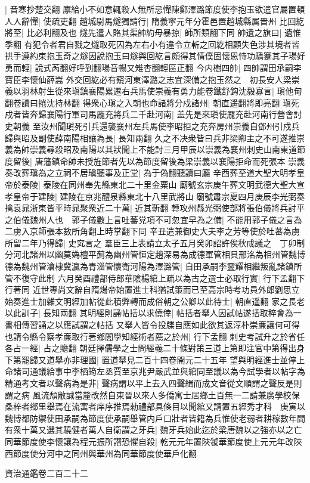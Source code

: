 |{
	音寒抄楚交翻}
廪給小不如意輒殺人無所忌憚陳鄭澤潞節度使李抱玉欲遣官屬置頓人人辭憚|{
	使疏吏翻}
趙城尉馬燧獨請行|{
	隋義寜元年分霍邑置趙城縣属晋州}
比回紇將至|{
	比必利翻及也}
燧先遣人賂其渠帥約毋暴掠|{
	師所類翻下同}
帥遺之旗曰|{
	遺惟季翻}
有犯令者君自戮之燧取死囚為左右小有違令立斬之回紇相顧失色涉其境者皆拱手遵約束抱玉奇之燧因說抱玉曰燧與回紇言頗得其情僕固懷恩恃功驕蹇其子瑒好勇而輕|{
	說式芮翻好呼到翻瑒音暢又雉杏翻輕區正翻}
今内樹四帥|{
	四帥謂田承嗣李寶臣李懷仙薛嵩}
外交回紇必有窺河東澤潞之志宜深備之抱玉然之　初長安人梁崇義以羽林射生從來瑱鎮襄陽累遷右兵馬使崇義有勇力能卷鐵舒鈎沈毅寡言|{
	瑱他甸翻卷讀曰捲沈持林翻}
得衆心瑱之入朝也命諸將分戍諸州|{
	朝直遥翻將即亮翻}
瑱死戍者皆奔歸襄陽行軍司馬龐充將兵二千赴河南|{
	盖先是來瑱使龎充赴河南行營會討史朝義}
至汝州聞瑱死引兵還襲襄州左兵馬使李昭拒之充奔房州崇義自鄧州引戍兵歸與昭及副使薛南陽相讓為長|{
	長知兩翻}
久之不决衆皆曰兵非梁卿主之不可遂推崇義為帥崇義尋殺昭及南陽以其狀聞上不能討三月甲辰以崇義為襄州刺史山南東道節度留後|{
	唐藩鎮命帥未授旌節者先以為節度留後為梁崇義以襄陽拒命而死張本}
崇義奏改葬瑱為之立祠不居瑱聽事及正堂|{
	為于偽翻聽讀曰廳}
辛酉葬至道大聖大明孝皇帝於泰陵|{
	泰陵在同州奉先縣東北二十里金粟山}
廟號玄宗庚午葬文明武德大聖大宣孝皇帝于建陵|{
	建陵在京兆醴泉縣東北十八里武將山}
廟號肅宗夏四月庚辰李光弼奏擒袁晁浙東皆平時晁聚衆近二十萬|{
	近其靳翻}
轉攻州縣光弼使部將張伯儀將兵討平之伯儀魏州人也　郭子儀數上言吐蕃党項不可忽宜早為之備|{
	不能用郭子儀之言為二虜入京師張本數所角翻上時掌翻下同}
辛丑遣兼御史大夫李之芳等使於吐蕃為虜所留二年乃得歸|{
	史䆒言之}
羣臣三上表請立太子五月癸卯詔許俟秋成議之　丁卯制分河北諸州以幽莫媯檀平薊為幽州管恒定趙深易為成德軍管相貝邢洺為相州管魏博德為魏州管滄棣冀瀛為青淄管懷衛河陽為澤潞管|{
	自田承嗣李靈耀相繼叛亂諸鎮所管不復守此制}
六月癸酉禮部侍郎華隂楊綰上疏以為古之選士必取行實|{
	行下孟翻下行著同}
近世專尚文辭自隋煬帝始置進士科猶試策而已至高宗時考功員外郎劉思立始奏進士加雜文明經加帖從此積弊轉而成俗朝之公卿以此待士|{
	朝直遥翻}
家之長老以此訓子|{
	長知兩翻}
其明經則誦帖括以求僥倖|{
	帖括者舉人因試帖遂括取稡會為一書相傳習誦之以應試謂之帖括}
又舉人皆令投牒自應如此欲其返淳朴崇亷讓何可得也請令縣令察孝亷取行著鄉閭學知經術者薦之於州|{
	行下孟翻}
刺史考試升之於省任各占一經|{
	占之贍翻}
朝廷擇儒學之士問經義二十條對策三道上第即注官中第得出身下第罷歸又道舉亦非理國|{
	置道舉見二百十四卷開元二十五年}
望與明經進士並停上命諸司通議給事中李栖筠左丞賈至京兆尹嚴武並與綰同至議以為今試學者以帖字為精通考文者以聲病為是非|{
	聲病謂以平上去入四聲緝而成文音從文順謂之聲反是則謂之病}
風流頹敝誠當釐改然自東晉以來人多僑寓士居鄉土百無一二請兼廣學校保桑梓者鄉里舉焉在流寓者庠序推焉勑禮部具條目以聞綰又請置五經秀才科　庚寅以魏博都防禦使田承嗣為節度使承嗣舉管内戶口壯者皆籍為兵惟使老弱者耕稼數年間有衆十萬又選其驍健者萬人自衛謂之牙兵|{
	魏牙兵始此迄於梁唐魏以之強亦以之亡}
同華節度使李懷讓為程元振所譛恐懼自殺|{
	乾元元年置陜虢華節度使上元元年改陜西節度使分河中之同州與華州為同華節度使華戶化翻}


資治通鑑卷二百二十二
